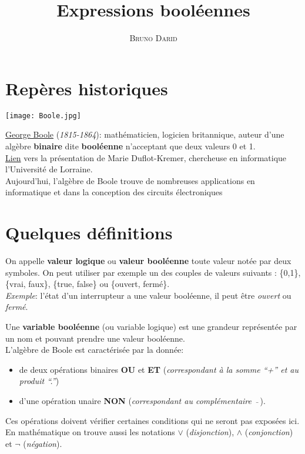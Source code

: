 \documentclass[11pt,french]{article}
\title{Expressions booléennes}
\author{\textsc{Bruno Darid}}
\makeatletter
\def\maxwidth{\ifdim\Gin@nat@width>\linewidth\linewidth
    \else\Gin@nat@width\fi}
\let\Oldincludegraphics\includegraphics
\renewcommand{\includegraphics}[1]{\Oldincludegraphics[width=.8\maxwidth]{#1}}
\makeatother
\begin{document}
  	\renewcommand{\contentsname}{\textsc{Plan}}    
 	\maketitle
 	\tableofcontents
    \newpage
    \hypertarget{repuxe8res-historiques}{%
\section{Repères historiques}\label{repuxe8res-historiques}}
\begin{center}
\texttt{[image: Boole.jpg]}
\end{center}

\href{https://fr.wikipedia.org/wiki/George_Boole}{George Boole}
(\emph{1815-1864}): mathématicien, logicien britannique, auteur d'une
algèbre \textbf{binaire} dite \textbf{booléenne} n'acceptant que deux
valeurs 0 et 1.\\
\href{https://www.dailymotion.com/video/x71hxwp}{Lien} vers la
présentation de Marie Duflot-Kremer, chercheuse en informatique
l'Université de Lorraine.\\
Aujourd'hui, l'algèbre de Boole trouve de nombreuses applications en
informatique et dans la conception des circuits électroniques

    \hypertarget{quelques-duxe9finitions}{%
\section{Quelques définitions}\label{quelques-duxe9finitions}}

On appelle \textbf{valeur logique} ou \textbf{valeur booléenne} toute
valeur notée par deux symboles. On peut utiliser par exemple un des
couples de valeurs suivants : \{0,1\}, \{vrai, faux\}, \{true, false\}
ou \{ouvert, fermé\}.\\
\emph{Exemple}: l'état d'un interrupteur a une valeur booléenne, il peut
être \emph{ouvert} ou \emph{fermé}.

Une \textbf{variable booléenne} (ou variable logique) est une grandeur
représentée par un nom et pouvant prendre une valeur booléenne.\\

L'algèbre de Boole est caractérisée par la donnée:
\begin{itemize}
\item de deux opérations binaires \textbf{OU} et \textbf{ET}
(\emph{correspondant à la somme ``+'' et au produit ``.''})
\item d'une opération unaire \textbf{NON} (\emph{correspondant au
complémentaire \(\ \bar{}\ \)}).
\end{itemize}
Ces opérations doivent vérifier certaines conditions qui ne seront pas
exposées ici. En mathématique on trouve aussi les notations \(\lor\)
(\emph{disjonction}), \(\wedge\) (\emph{conjonction}) et \(\lnot\)
(\emph{négation}).\\
\end{document}
